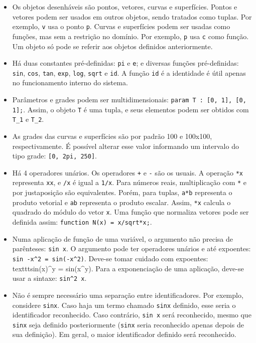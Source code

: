 \begin{itemize}
\item
Os objetos desenháveis são pontos, vetores, curvas e superfícies.
Pontos e vetores podem ser usados em outros objetos, sendo tratados como tuplas.
Por exemplo, \texttt{v} usa o ponto \texttt{p}.
Curvas e superfícies podem ser usadas como funções, mas sem a restrição no domínio.
Por exemplo, \texttt{p} usa \texttt{c} como função.
Um objeto só pode se referir aos objetos definidos anteriormente.

\item
Há duas constantes pré-definidas: \texttt{pi} e \texttt{e};
e diversas funções pré-definidas:
\texttt{sin}, \texttt{cos}, \texttt{tan},
\texttt{exp}, \texttt{log}, \texttt{sqrt} e \texttt{id}.
A função \texttt{id} é a identidade é útil apenas no funcionamento interno do sistema.

\item
Parâmetros e grades podem ser multidimensionais:
\texttt{param T : [0, 1], [0, 1];}. Assim, o objeto \texttt{T} é uma tupla,
e seus elementos podem ser obtidos com \texttt{T\_1} e \texttt{T\_2}.

\item As grades das curvas e superfícies são por padrão 100 e 100x100, respectivamente.
É possível alterar esse valor informando um intervalo do
tipo grade: \texttt{[0, 2pi, 250]}.

\item
Há 4 operadores unários. Os operadores \texttt{+} e \texttt{-} são os usuais.
A operação \texttt{*x} representa \texttt{xx}, e \texttt{/x} é igual a \texttt{1/x}.
Para números reais, multiplicação com \texttt{*} e por justaposição são equivalentes.
Porém, para tuplas, \texttt{a*b} representa o produto vetorial
e \texttt{ab} representa o produto escalar.
Assim, \texttt{*x} calcula o quadrado do módulo do vetor \texttt{x}.
Uma função que normaliza vetores pode ser
definida assim: \texttt{function N(x) = x/sqrt*x;}.

\item
Numa aplicação de função de uma variável, o argumento não precisa de parênteses:
\texttt{sin x}.
O argumento pode ter operadores unários e até expoentes:
\texttt{sin -x\textasciicircum2 = sin(-x\textasciicircum2)}.
Deve-se tomar cuidado com expoentes:
\\texttt{sin(x)\textasciicircum y = sin(x\textasciicircum y)}.
Para a exponenciação de uma aplicação,
deve-se usar a sintaxe: \texttt{sin\textasciicircum2 x}.

\item
Não é sempre necessário uma separação entre identificadores.
Por exemplo, considere \texttt{sinx}.
Caso haja um termo chamado \texttt{sinx} definido, esse seria o
identificador reconhecido.
Caso contrário, \texttt{sin x} será reconhecido,
mesmo que \texttt{sinx} seja definido posteriormente
(\texttt{sinx} seria reconhecido apenas depois de sua definição).
Em geral, o maior identificador definido será reconhecido.
\end{itemize}

